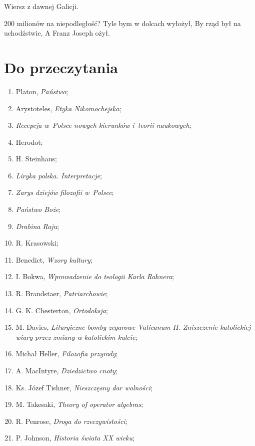 \documentclass[a4paper,11pt]{article}
\begin{document}
\vspace{\spaceOne}


Wiersz z dawnej Galicji.

200 milionów na niepodległość? Tyle bym w dolcach wyłożył, By rząd był
na uchodźstwie, A Franz Joseph ożył.





\newpage
\section{Do przeczytania}

\vspace{\spaceTwo}


\begin{enumerate}
\item Platon, \emph{Państwo};
\item Arystoteles, \emph{Etyka Nikomochejska};
\item \emph{Recepcja w~Polsce nowych kierunków i~teorii naukowych};
\item Herodot;
\item H. Steinhaus;
\item \emph{Liryka polska. Interpretacje};
\item \emph{Zarys dziejów filozofii w~Polsce};
\item \emph{Państwo Boże};
\item \emph{Drabina Raju};
\item R. Krasowski;
\item Benedict, \emph{Wzory kultury};
\item I. Bokwa, \emph{Wprowadzenie do teologii Karla Rahnera};
\item R. Brandstaer, \emph{Patriarchowie};
\item G. K. Chesterton, \emph{Ortodoksja};
\item M. Davies, \emph{Liturgiczne bomby zegarowe Vaticanum II.
    Zniszczenie katolickiej wiary przez zmiany w katolickim kulcie};
\item Michał Heller, \emph{Filozofia przyrody};
\item A. MacIntyre, \emph{Dziedzictwo cnoty};
\item Ks. Józef Tishner, \emph{Nieszczęsny dar wolności};
\item M. Takesaki, \emph{Theory of operator algebras};
\item R. Penrose, \emph{Droga do rzeczywistości};
\item P. Johnson, \emph{Historia świata XX wieku};

\end{enumerate}
\end{document}
